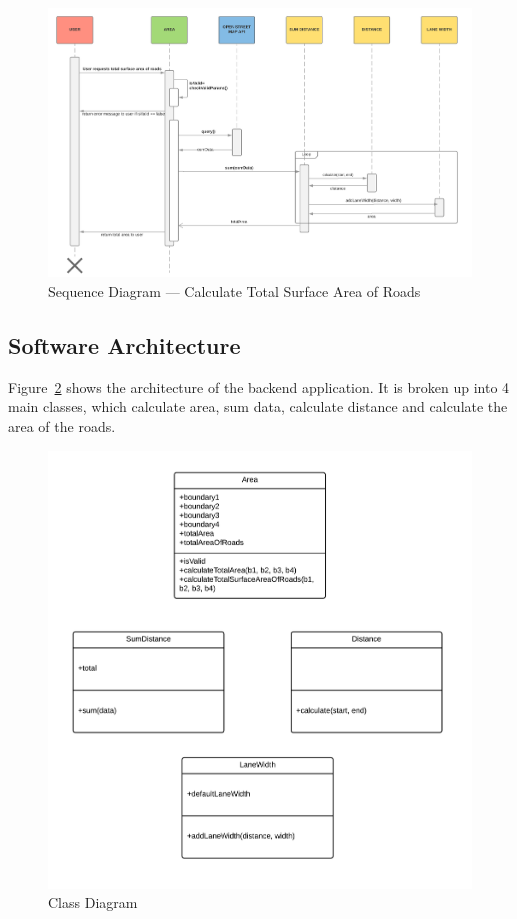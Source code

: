 \documentclass[a4paper,11pt]{article}
\begin{document}
\begin{figure}[H]
  \includegraphics[width=\textwidth]{sequence-diagram-calculate-total-surface-area-of-roads}
  \caption{Sequence Diagram --- Calculate Total Surface Area of
  Roads}\label{fig:seq-total-area-roads}
\end{figure}

\subsection{Software Architecture}

Figure~\ref{fig:class-diagram} shows the architecture of the backend
application. It is broken up into 4 main classes, which calculate area, sum
data, calculate distance and calculate the area of the roads.

\begin{figure}[H]
  \includegraphics[width=\textwidth]{class-diagram}
  \caption{Class Diagram}\label{fig:class-diagram}
\end{figure}
\end{document}
